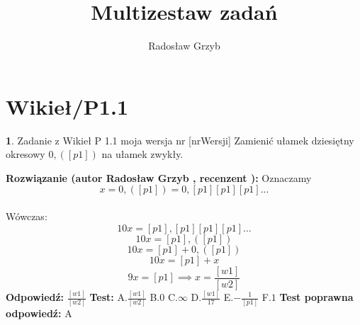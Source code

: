 \documentclass[12pt, a4paper]{article}
\title{Multizestaw zadań}
\author{Radosław Grzyb}
\date{}
\theoremstyle{definition} %
\newtheorem{zad}{}
\newcommand{\kategoria}[1]{\section{#1}} %
\newcommand{\zadStart}[1]{\begin{zad}#1\newline} %
\newcommand{\zadStop}{\end{zad}}   %
\newcommand{\rozwStart}[2]{\noindent \textbf{Rozwiązanie (autor #1 , recenzent #2): }\newline} %
\newcommand{\rozwStop}{\newline}                                            %
\newcommand{\odpStart}{\noindent \textbf{Odpowiedź:}\newline}    %
\newcommand{\odpStop}{\newline}                                             %
\newcommand{\testStart}{\noindent \textbf{Test:}\newline} %
\newcommand{\testStop}{\newline} %
\newcommand{\kluczStart}{\noindent \textbf{Test poprawna odpowiedź:}\newline} %
\newcommand{\kluczStop}{\newline} %
\begin{document}
\maketitle
\kategoria{Wikieł/P1.1}
\zadStart{Zadanie z Wikieł P 1.1 moja wersja nr [nrWersji]}
Zamienić ułamek dziesiętny okresowy $0,([p1])$ na ułamek zwykły. 
\zadStop
\rozwStart{Radosław Grzyb}{}
Oznaczamy $$x=0,([p1])=0,[p1][p1][p1]...$$\\
Wówczas:
$$10x=[p1],[p1][p1][p1]...$$
$$10x=[p1],([p1])$$
$$10x=[p1]+0,([p1])$$
$$10x=[p1]+x$$
$$9x=[p1]\implies x=\frac{[w1]}{[w2]}$$
\rozwStop
\odpStart
$\frac{[w1]}{[w2]}$
\odpStop
\testStart
A.$\frac{[w1]}{[w2]}$
B.$0$
C.$\infty$
D.$\frac{[w1]}{17}$
E.$-\frac{1}{[p1]}$
F.$1$
\testStop
\kluczStart
A
\kluczStop
\end{document}

